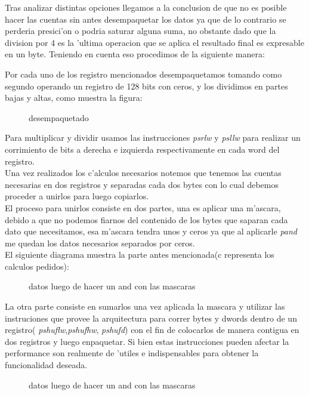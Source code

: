Tras analizar distintas opciones llegamos a la conclusion de
que no es posible  hacer las cuentas sin antes desempaquetar los datos ya que de lo contrario se perderia
presici'on o  podria saturar alguna suma, no obstante dado que la division por 4 es la 'ultima operacion que 
se aplica el resultado final es expresable en un byte. Teniendo en cuenta eso procedimos de la siguiente 
manera: 

Por cada uno de los registro mencionados desempaquetamos tomando como segundo operando un registro de 128
bits con ceros, y los dividimos en partes bajas y altas, como muestra la figura: 

\begin{figure}[hb]
\caption{desempaquetado}
\label{est:m-uno}
\end{figure}

Para multiplicar y dividir usamos las instrucciones \textit{psrlw} y \textit{psllw} para realizar un corrimiento 
de bits a derecha e izquierda respectivamente en cada word del registro. \\
Una vez realizados los c'alculos necesarios notemos que tenemos las cuentas necesarias en dos registros
y separadas cada dos bytes con lo cual debemos proceder a unirlos para luego copiarlos. \\
El proceso para unirlos consiste en dos partes, una es aplicar una m'ascara, debido a que no podemos 
fiarnos del contenido de los bytes que saparan cada dato que necesitamos, esa m'ascara tendra unos 
y ceros ya que al aplicarle \textit{pand} me quedan los datos necesarios separados por ceros.\\
El siguiente diagrama muestra la parte antes mencionada(c representa los calculos pedidos):
\begin{figure}[hb]
\caption{datos luego de hacer un and con las mascaras}
\label{est:m-uno}
\end{figure}
La otra parte consiste en sumarlos una vez aplicada la mascara y utilizar las instruciones que provee
la arquitectura para correr bytes y dwords dentro de un registro( \textit{pshuflw},\textit{pshufhw},
\textit{pshufd}) con el fin de colocarlos de manera contigua en dos registros y luego enpaquetar. Si bien 
estas instrucciones pueden afectar la performance son realmente de 'utiles e
indispensables para obtener la funcionalidad deseada.
\begin{figure}[hb]
\caption{datos luego de hacer un and con las mascaras}
\label{est:m-uno}
\end{figure}

